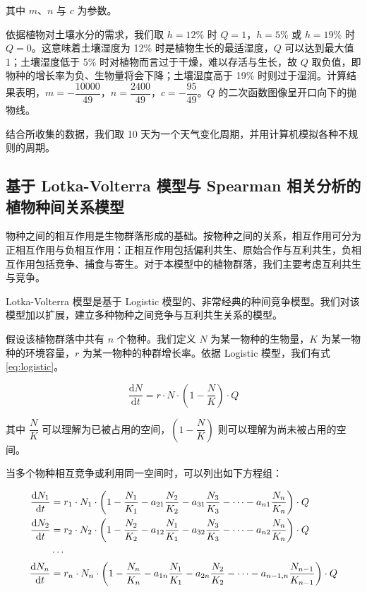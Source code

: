 \documentclass[11pt,a4paper]{ctexart}
\begin{document}
其中 $m$、$n$ 与 $c$ 为参数。

依据植物对土壤水分的需求，我们取 $h=12\%$ 时 $Q=1$，$h=5\%$ 或 $h=19\%$ 时 $Q=0$。这意味着土壤湿度为 12\% 时是植物生长的最适湿度，$Q$ 可以达到最大值 1；土壤湿度低于 5\% 时对植物而言过于干燥，难以存活与生长，故 $Q$ 取负值，即物种的增长率为负、生物量将会下降；土壤湿度高于 19\% 时则过于湿润。计算结果表明，$m=-\dfrac{10000}{49}$，$n=\dfrac{2400}{49}$，$c=-\dfrac{95}{49}$。$Q$ 的二次函数图像呈开口向下的抛物线。

结合所收集的数据，我们取 10 天为一个天气变化周期，并用计算机模拟各种不规则的周期。

\subsection{基于 Lotka-Volterra 模型与 Spearman 相关分析的植物种间关系模型}

物种之间的相互作用是生物群落形成的基础。按物种之间的关系，相互作用可分为正相互作用与负相互作用：正相互作用包括偏利共生、原始合作与互利共生，负相互作用包括竞争、捕食与寄生。对于本模型中的植物群落，我们主要考虑互利共生与竞争。

Lotka-Volterra 模型是基于 Logistic 模型的、非常经典的种间竞争模型。我们对该模型加以扩展，建立多种物种之间竞争与互利共生关系的模型。

假设该植物群落中共有 $n$ 个物种。我们定义 $N$ 为某一物种的生物量，$K$ 为某一物种的环境容量，$r$ 为某一物种的种群增长率。依据 Logistic 模型，我们有式 \eqref{eq:logistic}。

\begin{equation}
\frac{\mathrm{d}N}{\mathrm{d}t}=r\cdot N\cdot\left(1-\frac{N}{K}\right)\cdot Q
\label{eq:logistic}
\end{equation}

其中 $\dfrac{N}{K}$ 可以理解为已被占用的空间，$\left(1-\dfrac{N}{K}\right)$ 则可以理解为尚未被占用的空间。

当多个物种相互竞争或利用同一空间时，可以列出如下方程组：

\begin{align}
\frac{\mathrm{d}N_1}{\mathrm{d}t} &= r_1\cdot N_1\cdot\left(1-\frac{N_1}{K_1}-a_{21}\frac{N_2}{K_2}-a_{31}\frac{N_3}{K_3}-\cdots-a_{n1}\frac{N_n}{K_n}\right)\cdot Q \notag\\
\frac{\mathrm{d}N_2}{\mathrm{d}t} &= r_2\cdot N_2\cdot\left(1-\frac{N_2}{K_2}-a_{12}\frac{N_1}{K_1}-a_{32}\frac{N_3}{K_3}-\cdots-a_{n2}\frac{N_n}{K_n}\right)\cdot Q \notag\\
&\cdots \notag\\
\frac{\mathrm{d}N_n}{\mathrm{d}t} &= r_n\cdot N_n\cdot\left(1-\frac{N_n}{K_n}-a_{1n}\frac{N_1}{K_1}-a_{2n}\frac{N_2}{K_2}-\cdots-a_{n-1,n}\frac{N_{n-1}}{K_{n-1}}\right)\cdot Q \notag
\end{align}
\end{document}
